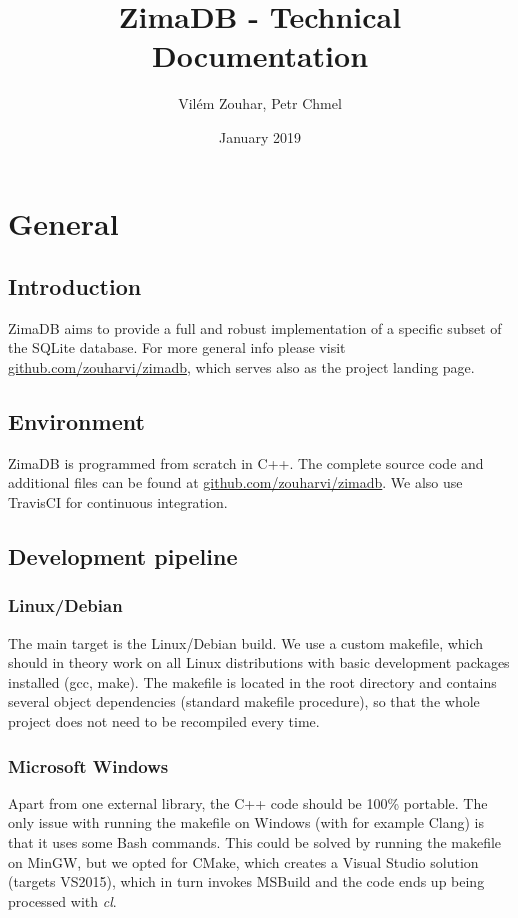 \documentclass[a4paper]{article}
\title{\textbf{ZimaDB} - Technical Documentation}
\author{Vilém Zouhar, Petr Chmel}
\date{January 2019}
\begin{document}
\maketitle

\section{General}
\subsection{Introduction}
ZimaDB aims to provide a full and robust implementation of a specific subset of the SQLite database. For more general info please visit \href{https://github.com/zouharvi/zimadb}{github.com/zouharvi/zimadb}, which serves also as the project landing page.

\subsection{Environment}
ZimaDB is programmed from scratch in C++. The complete source code and additional files can be found at \href{https://github.com/zouharvi/zimadb}{github.com/zouharvi/zimadb}. We also use TravisCI for continuous integration. 

\subsection{Development pipeline}
\subsubsection{Linux/Debian}
The main target is the Linux/Debian build. We use a custom makefile, which should in theory work on all Linux distributions with basic development packages installed (gcc, make). The makefile is located in the root directory and contains several object dependencies (standard makefile procedure), so that the whole project does not need to be recompiled every time.

\subsubsection{Microsoft Windows}
Apart from one external library, the C++ code should be 100\% portable. The only issue with running the makefile on Windows (with for example Clang) is that it uses some Bash commands. This could be solved by running the makefile on MinGW, but we opted for CMake, which creates a Visual Studio solution (targets VS2015), which in turn invokes MSBuild and the code ends up being processed with \textit{cl}.
\end{document}
